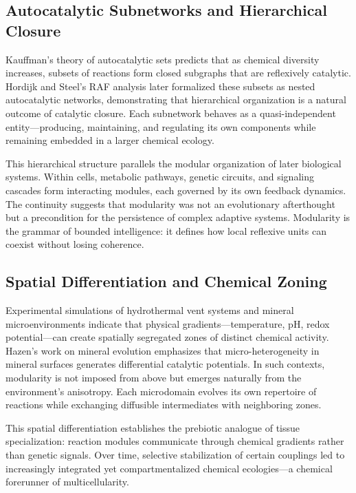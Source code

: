 \documentclass[11pt,a4paper]{article}
\begin{document}
\subsection{Autocatalytic Subnetworks and Hierarchical Closure}

Kauffman’s theory of autocatalytic sets \citep{Kauffman1993OriginsOfOrder} predicts that as chemical diversity increases, subsets of reactions form closed subgraphs that are reflexively catalytic.  Hordijk and Steel’s RAF analysis \citep{HordijkSteel2012RAF} later formalized these subsets as nested autocatalytic networks, demonstrating that hierarchical organization is a natural outcome of catalytic closure.  Each subnetwork behaves as a quasi-independent entity—producing, maintaining, and regulating its own components while remaining embedded in a larger chemical ecology.

This hierarchical structure parallels the modular organization of later biological systems.  Within cells, metabolic pathways, genetic circuits, and signaling cascades form interacting modules, each governed by its own feedback dynamics.  The continuity suggests that modularity was not an evolutionary afterthought but a precondition for the persistence of complex adaptive systems.  Modularity is the grammar of bounded intelligence: it defines how local reflexive units can coexist without losing coherence.

\subsection{Spatial Differentiation and Chemical Zoning}

Experimental simulations of hydrothermal vent systems and mineral microenvironments indicate that physical gradients—temperature, pH, redox potential—can create spatially segregated zones of distinct chemical activity.  Hazen’s work on mineral evolution \citep{Hazen2010EvolutionMinerals} emphasizes that micro-heterogeneity in mineral surfaces generates differential catalytic potentials.  In such contexts, modularity is not imposed from above but emerges naturally from the environment’s anisotropy.  Each microdomain evolves its own repertoire of reactions while exchanging diffusible intermediates with neighboring zones.  

This spatial differentiation establishes the prebiotic analogue of tissue specialization: reaction modules communicate through chemical gradients rather than genetic signals.  Over time, selective stabilization of certain couplings led to increasingly integrated yet compartmentalized chemical ecologies—a chemical forerunner of multicellularity.
\end{document}

